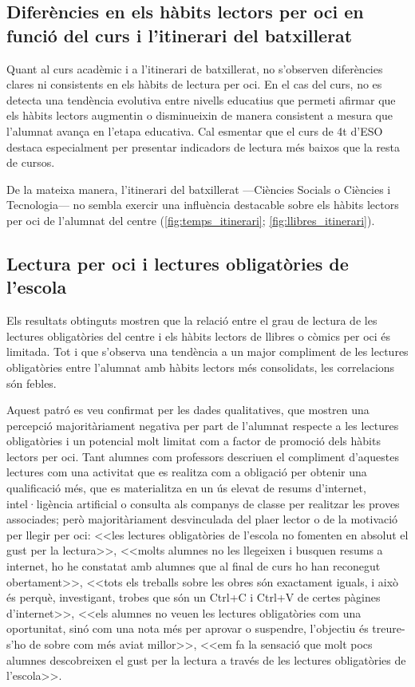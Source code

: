 \documentclass[12pt]{article}
\begin{document}
\subsection{Diferències en els hàbits lectors per oci en funció del curs i l'itinerari del batxillerat}
Quant al curs acadèmic i a l’itinerari de batxillerat, no s’observen diferències clares ni consistents en els hàbits de lectura per oci. En el cas del curs, no es detecta una tendència evolutiva entre nivells educatius que permeti afirmar que els hàbits lectors augmentin o disminueixin de manera consistent a mesura que l’alumnat avança en l’etapa educativa. Cal esmentar que el curs de 4t d'ESO destaca especialment per presentar indicadors de lectura més baixos que la resta de cursos. 

De la mateixa manera, l'itinerari del batxillerat ---Ciències Socials o Ciències i Tecnologia--- no sembla exercir una influència destacable sobre els hàbits lectors per oci de l’alumnat del centre (\autoref{fig:temps_itinerari}; \autoref{fig:llibres_itinerari}).

\subsection{Lectura per oci i lectures obligatòries de l'escola}
Els resultats obtinguts mostren que la relació entre el grau de lectura de les lectures obligatòries del centre i els hàbits lectors de llibres o còmics per oci és limitada. Tot i que s’observa una tendència a un major compliment de les lectures obligatòries entre l’alumnat amb hàbits lectors més consolidats, les correlacions són febles.

Aquest patró es veu confirmat per les dades qualitatives, que mostren una percepció majoritàriament negativa per part de l'alumnat respecte a les lectures obligatòries i un potencial molt limitat com a factor de promoció dels hàbits lectors per oci. Tant alumnes com professors descriuen el compliment d'aquestes lectures com una activitat que es realitza com a obligació per obtenir una qualificació més, que es materialitza en un ús elevat de resums d'internet, intel·ligència artificial o consulta als companys de classe per realitzar les proves associades; però majoritàriament desvinculada del plaer lector o de la motivació per llegir per oci: <<les lectures obligatòries de l’escola no fomenten en absolut el gust per la lectura>>, <<molts alumnes no les llegeixen i busquen resums a internet, ho he constatat amb alumnes que al final de curs ho han reconegut obertament>>, <<tots els treballs sobre les obres són exactament iguals, i això és perquè, investigant, trobes que són un Ctrl+C i Ctrl+V de certes pàgines d'internet>>, <<els alumnes no veuen les lectures obligatòries com una oportunitat, sinó com una nota més per aprovar o suspendre, l'objectiu és treure-s'ho de sobre com més aviat millor>>, <<em fa la sensació que molt pocs alumnes descobreixen el gust per la lectura a través de les lectures obligatòries de l'escola>>.
\end{document}
